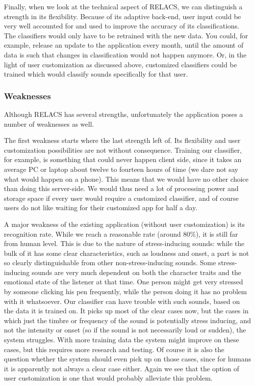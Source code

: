 \documentclass[a4paper]{article}
\begin{document}
Finally, when we look at the technical aspect of RELACS, we can distinguish a strength in its flexibility.
Because of its adaptive back-end, user input could be very well accounted for and used to improve the accuracy of its classifications.
The classifiers would only have to be retrained with the new data.
You could, for example, release an update to the application every month, until the amount of data is such that changes in classification would not happen anymore.
Or, in the light of user customization as discussed above, customized classifiers could be trained which would classify sounds specifically for that user.

\subsubsection{Weaknesses}
Although RELACS has several strengths, unfortunately the application poses a number of weaknesses as well.

The first weakness starts where the last strength left of.
Its flexibility and user customization possibilities are not without consequence.
Training our classifier, for example, is something that could never happen client side, since it takes an average PC or laptop about twelve to fourteen hours of time (we dare not say what would happen on a phone).
This means that we would have no other choice than doing this server-side.
We would thus need a lot of processing power and storage space if every user would require a customized classifier, and of course users do not like waiting for their customized app for half a day.

A major weakness of the existing application (without user customization) is its recognition rate.
While we reach a reasonable rate (around 80\%), it is still far from human level.
This is due to the nature of stress-inducing sounds:
while the bulk of it has some clear characteristics, such as loudness and onset, a part is not so clearly distinguishable from other non-stress-inducing sounds.
Some stress-inducing sounds are very much dependent on both the character traits and the emotional state of the listener at that time.
One person might get very stressed by someone clicking his pen frequently, while the person doing it has no problem with it whatsoever.
Our classifier can have trouble with such sounds, based on the data it is trained on.
It picks up most of the clear cases now,
but the cases in which just the timbre or frequency of the sound is potentially stress inducing, and not the intensity or onset (so if the sound is not necessarily loud or sudden), the system struggles.
With more training data the system might improve on these cases, but this requires more research and testing.
Of course it is also the question whether the system should even pick up on those cases, since for humans it is apparently not always a clear case either.
Again we see that the option of user customization is one that would probably alleviate this problem.
\end{document}
